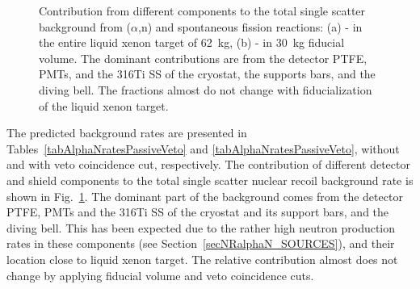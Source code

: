 \begin{figure}[!h]
\centering
{}
\caption[Contribution from different components to the total background from ($\alpha$,n) and spontaneous fission reactions]{Contribution from different components to the total single scatter background from ($\alpha$,n) and spontaneous fission reactions: (a) - in the entire liquid xenon target of 62~kg, (b) - in 30~kg fiducial volume. The dominant contributions are from the detector PTFE, PMTs, and the 316Ti SS of the cryostat, the supports bars, and the diving bell. The fractions almost do not change with fiducialization of the liquid xenon target.}
\label{figAlphaNpies}
\end{figure}

The predicted background rates are presented in Tables~\ref{tabAlphaNratesPassiveVeto} and \ref{tabAlphaNratesPassiveVeto}, without and with veto coincidence cut, respectively. The contribution of different detector and shield components to the total single scatter nuclear recoil background rate is shown in Fig.~\ref{figAlphaNpies}. The dominant part of the background comes from the detector PTFE, PMTs and the 316Ti SS of the cryostat and its support bars, and the diving bell. This has been expected due to the rather high neutron production rates in these components (see Section~\ref{secNRalphaN_SOURCES}), and their location close to liquid xenon target. The relative contribution almost does not change by applying fiducial volume and veto coincidence cuts.

